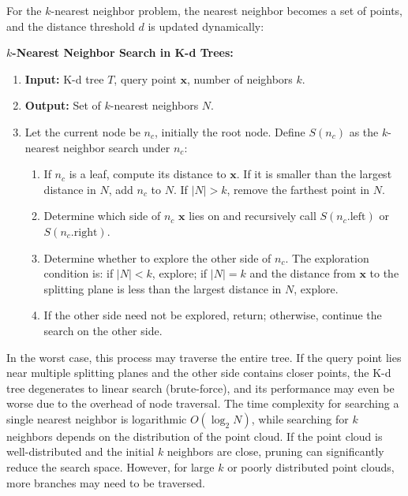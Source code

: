 For the \(k\)-nearest neighbor problem, the nearest neighbor becomes a set of points, and the distance threshold \(d\) is updated dynamically:

\begin{mdframed}
	\textbf{\(k\)-Nearest Neighbor Search in K-d Trees:}
	\begin{enumerate}
		\item \textbf{Input:} K-d tree \(T\), query point \(\mathbf{x}\), number of neighbors \(k\).
		\item \textbf{Output:} Set of \(k\)-nearest neighbors \(N\).
		\item Let the current node be \(n_c\), initially the root node. Define \(S(n_c)\) as the \(k\)-nearest neighbor search under \(n_c\):
		\begin{enumerate}
			\item If \(n_c\) is a leaf, compute its distance to \(\mathbf{x}\). If it is smaller than the largest distance in \(N\), add \(n_c\) to \(N\). If \(|N| > k\), remove the farthest point in \(N\).
			\item Determine which side of \(n_c\) \(\mathbf{x}\) lies on and recursively call \(S(n_c.\text{left})\) or \(S(n_c.\text{right})\).
			\item Determine whether to explore the other side of \(n_c\). The exploration condition is: if \(|N| < k\), explore; if \(|N| = k\) and the distance from \(\mathbf{x}\) to the splitting plane is less than the largest distance in \(N\), explore.
			\item If the other side need not be explored, return; otherwise, continue the search on the other side.
		\end{enumerate}
	\end{enumerate}
\end{mdframed}

In the worst case, this process may traverse the entire tree. If the query point lies near multiple splitting planes and the other side contains closer points, the K-d tree degenerates to linear search (brute-force), and its performance may even be worse due to the overhead of node traversal. The time complexity for searching a single nearest neighbor is logarithmic \(O(\log_2 N)\), while searching for \(k\) neighbors depends on the distribution of the point cloud. If the point cloud is well-distributed and the initial \(k\) neighbors are close, pruning can significantly reduce the search space. However, for large \(k\) or poorly distributed point clouds, more branches may need to be traversed.

